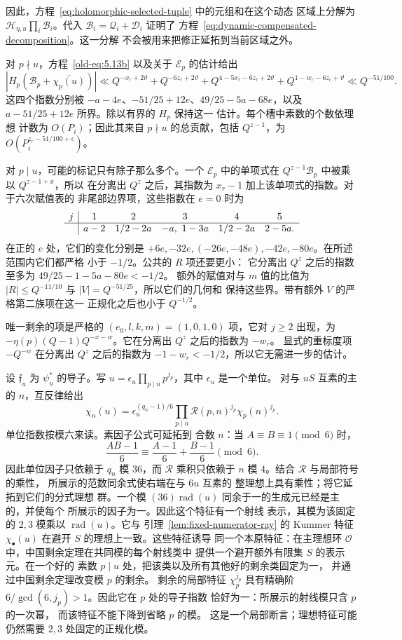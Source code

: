 因此，方程~\eqref{eq:holomorphic-selected-tuple} 中的元组和在这个动态
区域上分解为 $\mathcal H_{\eta,u}\prod_i\mathcal B_i$。代入
$\mathcal B_i=\mathcal Q_i+\mathcal D_i$ 证明了
方程~\eqref{eq:dynamic-compensated-decomposition}。这一分解
不会被用来把修正延拓到当前区域之外。

对 $p\nmid u$，方程~\eqref{old-eq:5.13b} 以及关于
$\mathcal E_p$ 的估计给出
\[
 |H_p(\mathcal B_p+\overline{\chi_p(u)})|
 \ll Q^{-x_r+2\vartheta}+Q^{-6z_r+2\vartheta}
       +Q^{4-5x_r-6z_r+2\vartheta}
       +Q^{1-w_r-6z_r+\vartheta}
 \ll Q^{-51/100}.
\]
这四个指数分别被
$-a-4e$、$-51/25+12e$、$49/25-5a-68e$，以及
$a-51/25+12e$ 所界。除以有界的 $H_p$ 保持这一
估计。每个槽中素数的个数依理想
计数为 $O(P_i)$；因此其来自 $p\nmid u$ 的总贡献，包括
$Q^{z-1}$，为 $O(P_i^{z_r-51/100+\epsilon})$。

对 $p\mid u$，可能的标记只有除子那么多个。一个
$\mathcal E_p$ 中的单项式在 $Q^{z-1}\mathcal B_p$ 中被乘以 $Q^{z-1+x}$，所以
在分离出 $Q^z$ 之后，其指数为 $x_r-1$ 加上该单项式的指数。对于六次赋值表的
非尾部边界项，这些指数在
$e=0$ 时为
\[
\begin{array}{c|ccccc}
 j&1&2&3&4&5\\\hline
 &a-2&1/2-2a&-a,\ 1-3a&1/2-2a&2-5a.
\end{array}
\]
在正的 $e$ 处，它们的变化分别是
$+6e,-32e,(-26e,-48e),-42e,-80e$。在所述范围内它们都严格
小于 $-1/2$。公共的 $R$ 项还要更小：
它分离出 $Q^z$ 之后的指数至多为 $49/25-1-5a-80e<-1/2$。
额外的赋值对与 $m$ 值的比值为
$|R|\le Q^{-11/10}$ 与 $|V|=Q^{-51/25}$，所以它们的几何和
保持这些界。带有额外
$V$ 的严格第二族项在这一
正规化之后也小于 $Q^{-1/2}$。

唯一剩余的项是严格的
$(e_0,l,k,m)=(1,0,1,0)$ 项，它对 $j\ge2$ 出现，为
$-\eta(p)(Q-1)Q^{-x-w}$。它在分离出 $Q^z$ 之后的指数为 $-w_r$。
显式的重标度项 $-Q^{-w}$ 在分离出 $Q^z$ 之后的指数为
$-1-w_r<-1/2$，所以它无需进一步的估计。

设 $\mathfrak f_u$ 为 $\psi_u^*$ 的导子。写
$u=\epsilon_u\prod_{p\mid u}p^{j_p}$，其中 $\epsilon_u$ 是一个单位。
对与 $uS$ 互素的主的 $n$，互反律给出
\[
 \chi_n(u)=\epsilon_u^{(q_n-1)/6}
       \prod_{p\mid u}\mathcal R(p,n)^{j_p}\chi_p(n)^{j_p}.
\]
单位指数按模六来读。素因子公式可延拓到
合数 $n$：当 $A\equiv B\equiv1\pmod6$ 时，
\[
 \frac{AB-1}{6}\equiv\frac{A-1}{6}+\frac{B-1}{6}\pmod6.
\]
因此单位因子只依赖于 $q_n$ 模 $36$，而
$\mathcal R$ 乘积只依赖于 $n$ 模 $4$。结合
$\mathcal R$ 与局部符号的乘性，
所展示的范数同余式使右端在与 $6u$ 互素的
整理想上具有乘性；将它延拓到它们的分式理想
群。一个模
$(36)\operatorname{rad}(u)$ 同余于一的生成元已经是主的，并使每个
所展示的因子为一。因此这个特征有一个射线
表示，其模为该固定的 $2,3$ 模乘以
$\operatorname{rad}(u)$。它与
引理~\ref{lem:fixed-numerator-ray} 的 Kummer 特征
$\chi_\bullet(u)$ 在避开 $S$ 的理想上一致。这些特征诱导
同一个本原特征：在主理想环
$\mathcal O$ 中，中国剩余定理在共同模的每个射线类中
提供一个避开额外有限集 $S$ 的表示元。在一个好的
素数 $p\mid u$ 处，把该类以及所有其他好的剩余类固定为一，
并通过中国剩余定理改变模 $p$ 的剩余。
剩余的局部特征 $\chi_p^{j_p}$ 具有精确阶
$6/\gcd(6,j_p)>1$。因此它在 $p$ 处的导子指数
恰好为一：所展示的射线模只含 $p$ 的一次幂，
而该特征不能下降到省略 $p$ 的模。
这是一个局部断言；理想特征可能仍然需要
$2,3$ 处固定的正规化模。

